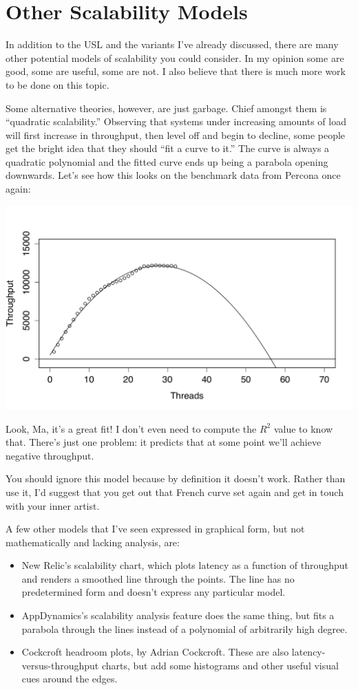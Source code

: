 \documentclass{vivid_layout}
\begin{document}
\section{Other Scalability Models}

In addition to the USL and the variants I've already discussed, there are many
other potential models of scalability you could consider. In my opinion some are
good, some are useful, some are not. I also believe that there is much more work
to be done on this topic.

Some alternative theories, however, are just garbage. Chief amongst them is
``quadratic scalability.'' Observing that systems under increasing amounts of
load will first increase in throughput, then level off and begin to decline,
some people get the bright idea that they should ``fit a curve to it.'' The curve
is always a quadratic polynomial and the fitted curve ends up being a parabola
opening downwards. Let's see how this looks on the benchmark data from Percona
once again:
\begin{center}
\includegraphics[width=.85\linewidth]{scalability/quadratic}
\end{center}

Look, Ma, it's a great fit! I don't even need to compute the $R^2$ value to know
that. There's just one problem: it predicts that at some point we'll achieve
negative throughput.

You should ignore this model because by definition it doesn't work. Rather than
use it, I'd suggest that you get out that French curve set again and get in
touch with your inner artist.

A few other models that I've seen expressed in graphical form, but not
mathematically and lacking analysis, are:

\begin{itemize}
\item New Relic's scalability chart, which plots latency as a function of
throughput and renders a smoothed line through the points. The line has no
predetermined form and doesn't express any particular model.
\item AppDynamics's scalability analysis feature does the same thing, but fits a
parabola through the lines instead of a polynomial of arbitrarily high degree.
\item Cockcroft headroom plots, by Adrian Cockcroft. These are also
latency-versus-throughput charts, but add some histograms and other useful
visual cues around the edges.
\end{itemize}
\end{document}
